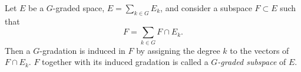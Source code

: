 Let $E$ be a $G$-graded space, $E = \sum_{k \in G} E_k$, and consider a subspace $F \subset E$ such that
$$F = \sum_{k \in G} F \cap E_k.$$
Then a $G$-gradation is induced in $F$ by assigning the degree $k$ to the vectors of $F \cap E_k$. $F$ together with its induced gradation is called a \textit{$G$-graded subspace} of $E$.
